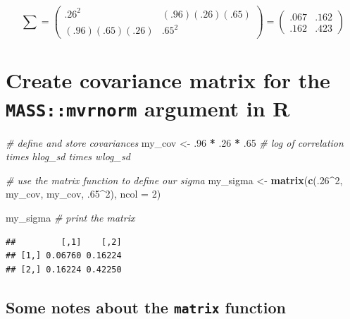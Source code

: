 \documentclass[
]{article}
\newenvironment{Shaded}{\begin{snugshade}}{\end{snugshade}}
\newcommand{\AttributeTok}[1]{\textcolor[rgb]{0.13,0.29,0.53}{#1}}
\newcommand{\CommentTok}[1]{\textcolor[rgb]{0.56,0.35,0.01}{\textit{#1}}}
\newcommand{\DecValTok}[1]{\textcolor[rgb]{0.00,0.00,0.81}{#1}}
\newcommand{\FunctionTok}[1]{\textcolor[rgb]{0.13,0.29,0.53}{\textbf{#1}}}
\newcommand{\NormalTok}[1]{#1}
\newcommand{\OtherTok}[1]{\textcolor[rgb]{0.56,0.35,0.01}{#1}}
\newcommand{\SpecialCharTok}[1]{\textcolor[rgb]{0.81,0.36,0.00}{\textbf{#1}}}
\begin{document}
\[\sum = \begin{pmatrix}
.26^2 & (.96)(.26)(.65) \\
(.96)(.65)(.26) & .65^2
\end{pmatrix} = \begin{pmatrix}
.067 & .162\\
.162 & .423
\end{pmatrix}\]

\hypertarget{create-covariance-matrix-for-the-massmvrnorm-argument-in-r}{%
\section{\texorpdfstring{Create covariance matrix for the
\texttt{MASS::mvrnorm} argument in
R}{Create covariance matrix for the MASS::mvrnorm argument in R}}\label{create-covariance-matrix-for-the-massmvrnorm-argument-in-r}}

\begin{Shaded}
\begin{Highlighting}[]
\CommentTok{\# define and store covariances}
\NormalTok{my\_cov }\OtherTok{\textless{}{-}} 
\NormalTok{  .}\DecValTok{96} \SpecialCharTok{*}\NormalTok{ .}\DecValTok{26} \SpecialCharTok{*}\NormalTok{ .}\DecValTok{65} \CommentTok{\# log of correlation times hlog\_sd times wlog\_sd}

\CommentTok{\# use the matrix function to define our sigma}
\NormalTok{my\_sigma }\OtherTok{\textless{}{-}}
  \FunctionTok{matrix}\NormalTok{(}\FunctionTok{c}\NormalTok{(.}\DecValTok{26}\SpecialCharTok{\^{}}\DecValTok{2}\NormalTok{, my\_cov, }
\NormalTok{           my\_cov, .}\DecValTok{65}\SpecialCharTok{\^{}}\DecValTok{2}\NormalTok{), }
         \AttributeTok{ncol =} \DecValTok{2}\NormalTok{)}

\NormalTok{my\_sigma          }\CommentTok{\# print the matrix}
\end{Highlighting}
\end{Shaded}

\begin{verbatim}
##         [,1]    [,2]
## [1,] 0.06760 0.16224
## [2,] 0.16224 0.42250
\end{verbatim}

\hypertarget{some-notes-about-the-matrix-function}{%
\subsection{\texorpdfstring{Some notes about the \texttt{matrix}
function}{Some notes about the matrix function}}\label{some-notes-about-the-matrix-function}}
\end{document}
